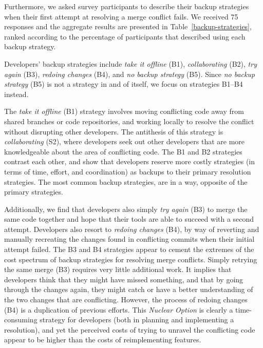 Furthermore, we asked survey participants to describe their backup strategies when their first attempt at resolving a merge conflict fails.
We received 75 responses and the aggregate results are presented in Table~\ref{backup-strategies}, ranked according to the percentage of participants that described using each backup strategy.

Developers' backup strategies include \textit{take it offline} (B1), \textit{collaborating} (B2), \textit{try again} (B3), \textit{redoing changes} (B4), and \textit{no backup strategy} (B5).
Since \textit{no backup strategy} (B5) is not a strategy in and of itself, we focus on strategies B1--B4 instead.

The \textit{take it offline} (B1) strategy involves moving conflicting code away from shared branches or code repositories, and working locally to resolve the conflict without disrupting other developers.
The antithesis of this strategy is \textit{collaborating} (S2), where developers seek out other developers that are more knowledgeable about the area of conflicting code.
The B1 and B2 strategies contrast each other, and show that developers reserve more costly strategies (in terms of time, effort, and coordination) as backups to their primary resolution strategies.
The most common backup strategies, are in a way, opposite of the primary strategies.

Additionally, we find that developers also simply \textit{try again} (B3) to merge the same code together and hope that their tools are able to succeed with a second attempt.
Developers also resort to \textit{redoing changes} (B4), by way of reverting and manually recreating the changes found in conflicting commits when their initial attempt failed.
The B3 and B4 strategies appear to cement the extremes of the cost spectrum of backup strategies for resolving merge conflicts.
Simply retrying the same merge (B3) requires very little additional work.
It implies that developers think that they might have missed something, and that by going through the changes again, they might catch or have a better understanding of the two changes that are conflicting.
However, the process of redoing changes (B4) is a duplication of previous efforts. %
This \textit{Nuclear Option} is clearly a time-consuming strategy for developers (both in planning and implementing a resolution), and yet the perceived costs of trying to unravel the conflicting code appear to be higher than the costs of reimplementing features.


